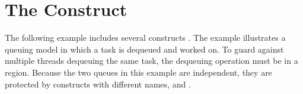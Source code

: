 \pagebreak
\section{The  Construct}
\label{sec:critical}

The following example includes several  constructs . The example 
illustrates a queuing model in which a task is dequeued and worked on. To guard 
against multiple threads dequeuing the same task, the dequeuing operation must 
be in a  region. Because the two queues in this example are independent, 
they are protected by  constructs with different names,  
and .




